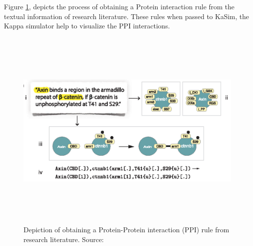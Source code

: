 \documentclass[msc,deptreport,ai]{infthesis}      %
\begin{document}
Figure \ref{fig:kappa}, depicts the process of obtaining a Protein interaction rule from the textual information of research literature. These rules when passed to KaSim, the Kappa simulator help to visualize the PPI interactions. 

\begin{figure}[H]
	\centering
	\captionsetup{justification=centering}
	\includegraphics[width=\linewidth,height=10cm,keepaspectratio]{kappa.png}	
	\caption{Depiction of obtaining a Protein-Protein interaction (PPI) rule from research literature. Source: \cite{kappaPlatform}}
	\label{fig:kappa}
\end{figure}
\end{document}
